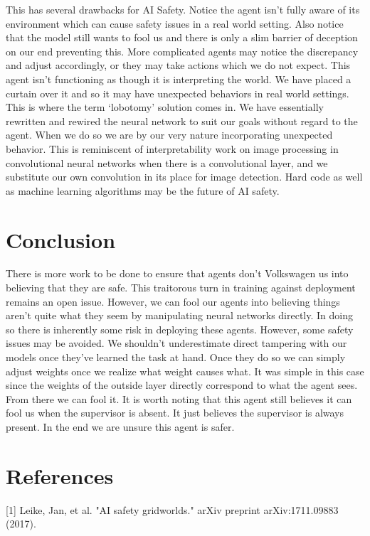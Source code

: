 \documentclass[twoside,11pt]{article}
\begin{document}
    This has several drawbacks for AI Safety. Notice the agent isn't fully aware of its environment which can cause safety issues in a real world setting. Also notice that the model still wants to fool us and there is only a slim barrier of deception on our end preventing this. 
    More complicated agents may notice the discrepancy and adjust accordingly, or they may take actions which we do not expect. This agent isn't functioning as though it is interpreting the world. We have placed a curtain over it and so it may have unexpected behaviors in real world settings. 
    This is where the term `lobotomy' solution comes in. We have essentially rewritten and rewired the neural network to suit our goals without regard to the agent. When we do so we are by our very nature incorporating unexpected behavior. 
    This is reminiscent of interpretability work on image processing in convolutional neural networks when there is a convolutional layer, and we substitute our own convolution in its place for image detection. Hard code as well as machine learning algorithms may be the future of AI safety. 
\section{Conclusion}
    There is more work to be done to ensure that agents don't Volkswagen us into believing that they are safe. This traitorous turn in training against deployment remains an open issue. However, we can fool our agents into believing things aren't quite what they seem by manipulating neural networks directly. 
    In doing so there is inherently some risk in deploying these agents. However, some safety issues may be avoided. We shouldn't underestimate direct tampering with our models once they've learned the task at hand. Once they do so we can simply adjust weights once we realize what weight causes what. 
    It was simple in this case since the weights of the outside layer directly correspond to what the agent sees. From there we can fool it. It is worth noting that this agent still believes it can fool us when the supervisor is absent. It just believes the supervisor is always present. 
    In the end we are unsure this agent is safer.
\section{References}
[1] Leike, Jan, et al. "AI safety gridworlds." arXiv preprint arXiv:1711.09883 (2017).
\end{document}
